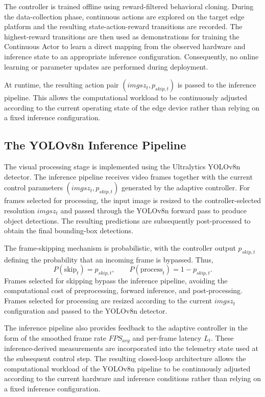 \documentclass{ieeeaccess}
\begin{document}
The controller is trained offline using reward-filtered behavioral cloning.
During the data-collection phase, continuous actions are explored on the
target edge platform and the resulting state-action-reward transitions are
recorded. The highest-reward transitions are then used as demonstrations for
training the Continuous Actor to learn a direct mapping from the observed
hardware and inference state to an appropriate inference configuration.
Consequently, no online learning or parameter updates are performed during
deployment.

At runtime, the resulting action pair $(imgsz_t,p_{skip,t})$ is passed to the
inference pipeline. This allows the computational workload to be continuously
adjusted according to the current operating state of the edge device rather
than relying on a fixed inference configuration.

\subsection{The YOLOv8n Inference Pipeline}

The visual processing stage is implemented using the Ultralytics YOLOv8n
detector. The inference pipeline receives video frames together with the
current control parameters $(imgsz_t, p_{skip,t})$ generated by the adaptive
controller. For frames selected for processing, the input image is resized to
the controller-selected resolution $imgsz_t$ and passed through the YOLOv8n
forward pass to produce object detections. The resulting predictions are
subsequently post-processed to obtain the final bounding-box detections.

The frame-skipping mechanism is probabilistic, with the controller output
$p_{skip,t}$ defining the probability that an incoming frame is bypassed.
Thus,
\begin{equation}
P(\mathrm{skip}_t) = p_{skip,t},
\qquad
P(\mathrm{process}_t) = 1-p_{skip,t}.
\end{equation}
Frames selected for skipping bypass the inference pipeline, avoiding the
computational cost of preprocessing, forward inference, and post-processing.
Frames selected for processing are resized according to the current
$imgsz_t$ configuration and passed to the YOLOv8n detector.

The inference pipeline also provides feedback to the adaptive controller in
the form of the smoothed frame rate $FPS_{avg}$ and per-frame latency $L_t$.
These inference-derived measurements are incorporated into the telemetry
state used at the subsequent control step. The resulting closed-loop
architecture allows the computational workload of the YOLOv8n pipeline to be
continuously adjusted according to the current hardware and inference
conditions rather than relying on a fixed inference configuration.
\end{document}
